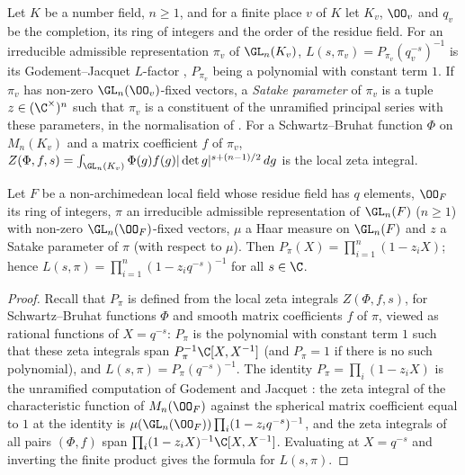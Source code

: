 Let $K$ be a number field, $n\ge1$, and for a finite place $v$ of $K$ let $K_v$, $\OO_v$ and $q_v$ be the completion,
its ring of integers and the order of the residue field. For an irreducible admissible representation $\pi_v$ of
$\GL_n(K_v)$, $L(s,\pi_v)=P_{\pi_v}(q_v^{-s})^{-1}$ is its Godement--Jacquet $L$-factor \cite{GodementJacquet1972},
$P_{\pi_v}$ being a polynomial with constant term $1$. If $\pi_v$ has non-zero $\GL_n(\OO_v)$-fixed vectors, a
\emph{Satake parameter} of $\pi_v$ is a tuple $z\in(\C^\times)^n$ such that $\pi_v$ is a constituent of the unramified
principal series with these parameters, in the normalisation of \cite{LeanSource2026}. For a Schwartz--Bruhat function
$\Phi$ on $M_n(K_v)$ and a matrix coefficient $f$ of $\pi_v$,
$Z(\Phi,f,s)=\int_{\GL_n(K_v)}\Phi(g)f(g)|\det g|^{s+(n-1)/2}\,dg$ is the local zeta integral.

\begin{theorem}\label{pf:modularity:lfunprod}
Let $F$ be a non-archimedean local field whose residue field has $q$ elements, $\OO_F$ its ring of integers, $\pi$ an
irreducible admissible representation of $\GL_n(F)$ ($n\ge1$) with non-zero $\GL_n(\OO_F)$-fixed vectors, $\mu$ a Haar
measure on $\GL_n(F)$ and $z$ a Satake parameter of $\pi$ (with respect to $\mu$). Then $P_\pi(X)=\prod_{i=1}^n(1-z_iX)$;
hence $L(s,\pi)=\prod_{i=1}^n(1-z_iq^{-s})^{-1}$ for all $s\in\C$.
\end{theorem}

\begin{proof}
Recall that $P_\pi$ is defined from the local zeta integrals $Z(\Phi,f,s)$, for Schwartz--Bruhat functions $\Phi$ and
smooth matrix coefficients $f$ of $\pi$, viewed as rational functions of $X=q^{-s}$: $P_\pi$ is the polynomial with
constant term $1$ such that these zeta integrals span $P_\pi^{-1}\C[X,X^{-1}]$ (and $P_\pi=1$ if there is no such
polynomial), and $L(s,\pi)=P_\pi(q^{-s})^{-1}$. The identity $P_\pi=\prod_i(1-z_iX)$ is the unramified computation of
Godement and Jacquet \cite{GodementJacquet1972}: the zeta integral of the characteristic function of $M_n(\OO_F)$ against
the spherical matrix coefficient equal to $1$ at the identity is $\mu(\GL_n(\OO_F))\prod_i(1-z_iq^{-s})^{-1}$, and the zeta
integrals of all pairs $(\Phi,f)$ span $\prod_i(1-z_iX)^{-1}\C[X,X^{-1}]$. Evaluating at $X=q^{-s}$ and inverting the finite
product gives the formula for $L(s,\pi)$.
\end{proof}

